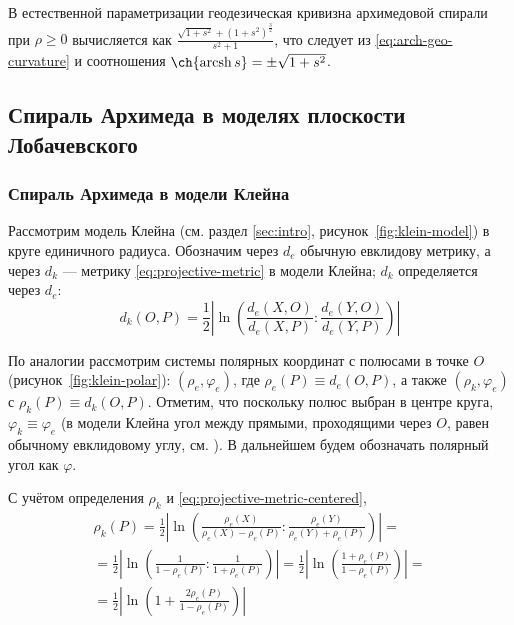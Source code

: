 \documentclass{article}
\numberwithin{equation}{section}
\renewcommand{\phi}{\varphi}
\DeclareMathOperator{\arcsh}{arcsh}
\providecommand{\abs}[1]{\left \lvert{#1}\right \rvert}
\begin{document}
В естественной параметризации геодезическая кривизна архимедовой
спирали при $\rho \geqslant 0$ вычисляется как $\frac{\sqrt{1+s^2} +
  (1+s^2)^{\frac{3}{2}}}{s^2+1}$, что следует из
\eqref{eq:arch-geo-curvature} и соотношения $\ch{\arcsh{s}} =
\pm\sqrt{1+s^2}$.

\clearpage
\subsection{Спираль Архимеда в моделях плоскости Лобачевского}

\subsubsection{Спираль Архимеда в модели Клейна}
\label{sec:arch-spiral-klein}

Рассмотрим модель Клейна (см. раздел \ref{sec:intro},
рисунок \ref{fig:klein-model}) в круге единичного радиуса. Обозначим
через $d_e$ обычную евклидову метрику, а через $d_k$ — метрику
\eqref{eq:projective-metric} в модели Клейна; $d_k$ определяется через
$d_e$:
\begin{equation}\label{eq:projective-metric-centered}
  d_k(O,P) = \frac{1}{2}\abs{\ln\left(\frac{d_e(X,O)}{d_e(X,P)}:\frac{d_e(Y,O)}{d_e(Y,P)}\right)}
\end{equation}

По аналогии рассмотрим системы полярных координат с полюсами в точке
$O$ (рисунок \ref{fig:klein-polar}): $(\rho_e, \phi_e)$, где
$\rho_e(P) \equiv d_e(O,P)$, а также $(\rho_k, \phi_e)$ с $\rho_k(P)
\equiv d_k(O, P)$. Отметим, что поскольку полюс выбран в центре круга,
$\phi_k \equiv \phi_e$ (в модели Клейна угол между прямыми,
проходящими через $O$, равен обычному евклидовому углу, см.
\cite{zaslavsky04}). В дальнейшем будем обозначать полярный угол как
$\phi$.



С учётом определения $\rho_k$ и \eqref{eq:projective-metric-centered},
\begin{multline}\label{eq:projective-metric-polar}
  \rho_k(P) =
  \frac{1}{2}\abs{\ln\left(\frac{\rho_e(X)}{\rho_e(X)-\rho_e(P)}:\frac{\rho_e(Y)}{\rho_e(Y)+\rho_e(P)}\right)}  = \\
  =\frac{1}{2}\abs{\ln\left(\frac{1}{1-\rho_e(P)}:\frac{1}{1+\rho_e(P)}\right)} =
  \frac{1}{2}\abs{\ln\left(\frac{1+\rho_e(P)}{1-\rho_e(P)}\right)} =\\
  = \frac{1}{2}\abs{\ln\left(1+\frac{2\rho_e(P)}{1-\rho_e(P)}\right)}
\end{multline}
\end{document}
